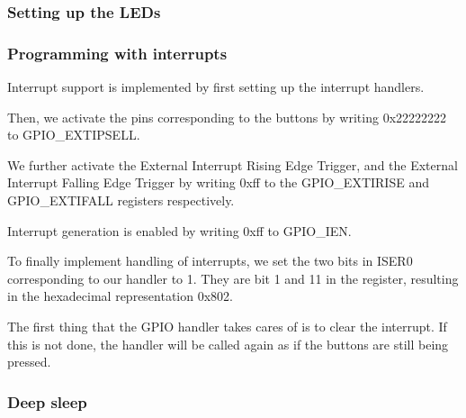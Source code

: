 \subsubsection{Setting up the LEDs}
\label{subsubsec:dev_pros_setup_led}

\subsubsection{Programming with interrupts}
\label{subsubsec:dev_pros_interrupts}

Interrupt support is implemented by first setting up the interrupt handlers.

Then, we activate the pins corresponding to the buttons by writing 0x22222222 to GPIO\_EXTIPSELL.

We further activate the External Interrupt Rising Edge Trigger, and the External Interrupt Falling Edge Trigger by writing 0xff to the GPIO\_EXTIRISE and GPIO\_EXTIFALL registers respectively.

Interrupt generation is enabled by writing 0xff to GPIO\_IEN.

To finally implement handling of interrupts, we set the two bits in ISER0 corresponding to our handler to 1. They are bit 1 and 11 in the register, resulting in the hexadecimal representation 0x802.

The first thing that the GPIO handler takes cares of is to clear the interrupt. If this is not done, the handler will be called again as if the buttons are still being pressed.

\subsubsection{Deep sleep}
\label{dev_pros_deep_sleep}
